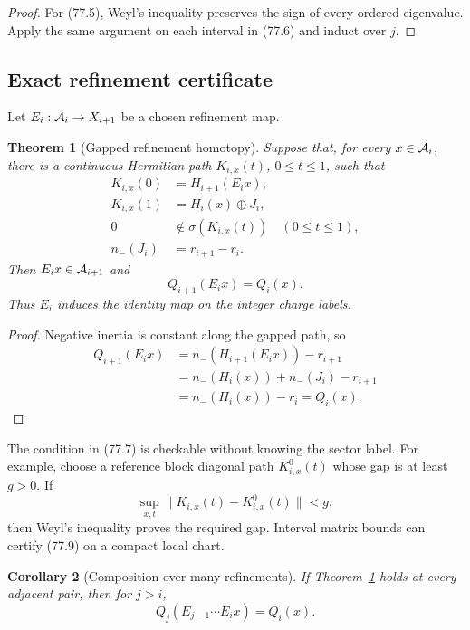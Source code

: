 \documentclass[11pt]{article}
\newtheorem{theorem}{Theorem}[section]
\newtheorem{corollary}[theorem]{Corollary}
\begin{document}
\begin{proof}
For (77.5), Weyl's inequality preserves the sign of every ordered
eigenvalue.  Apply the same argument on each interval in (77.6) and
induct over \(j\).
\end{proof}

\subsection{Exact refinement certificate}

Let \(E_i:{\cal A}_i\to X_{i+1}\) be a chosen refinement map.

\begin{theorem}[Gapped refinement homotopy]
\label{thm:v11v77-refine}
Suppose that, for every \(x\in{\cal A}_i\), there is a continuous
Hermitian path \(K_{i,x}(t)\), \(0\le t\le1\), such that
\[
 \begin{split}
 K_{i,x}(0)&=H_{i+1}(E_ix),\\
 K_{i,x}(1)&=H_i(x)\oplus J_i,\\
 0&\notin\sigma(K_{i,x}(t))\quad(0\le t\le1),                 \tag{77.7}\\
 n_-(J_i)&=r_{i+1}-r_i.
 \end{split}
\]
Then \(E_ix\in{\cal A}_{i+1}\) and
\[
                              Q_{i+1}(E_ix)=Q_i(x).            \tag{77.8}
\]
Thus \(E_i\) induces the identity map on the integer charge labels.
\end{theorem}

\begin{proof}
Negative inertia is constant along the gapped path, so
\[
 \begin{split}
 Q_{i+1}(E_ix)
 &=n_-(H_{i+1}(E_ix))-r_{i+1}\\
 &=n_-(H_i(x))+n_-(J_i)-r_{i+1}\\
 &=n_-(H_i(x))-r_i=Q_i(x).
 \end{split}
\]
\end{proof}

The condition in (77.7) is checkable without knowing the sector label.
For example, choose a reference block diagonal path \(K^0_{i,x}(t)\)
whose gap is at least \(g>0\).  If
\[
                 \sup_{x,t}\|K_{i,x}(t)-K^0_{i,x}(t)\|<g,     \tag{77.9}
\]
then Weyl's inequality proves the required gap.  Interval matrix
bounds can certify (77.9) on a compact local chart.

\begin{corollary}[Composition over many refinements]
\label{cor:v11v77-composition}
If Theorem~\ref{thm:v11v77-refine} holds at every adjacent pair, then
for \(j>i\),
\[
 Q_j(E_{j-1}\cdots E_i x)=Q_i(x).                             \tag{77.10}
\]
\end{corollary}
\end{document}
